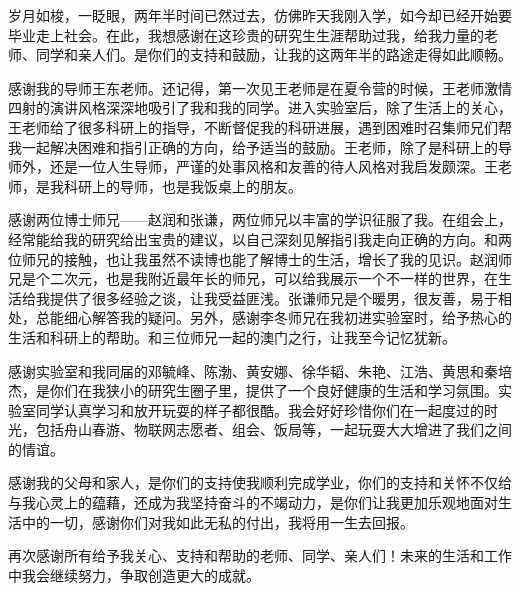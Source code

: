 \begin{thanks}
岁月如梭，一眨眼，两年半时间已然过去，仿佛昨天我刚入学，如今却已经开始要毕业走上社会。在此，我想感谢在这珍贵的研究生生涯帮助过我，给我力量的老师、同学和亲人们。是你们的支持和鼓励，让我的这两年半的路途走得如此顺畅。

感谢我的导师王东老师。还记得，第一次见王老师是在夏令营的时候，王老师激情四射的演讲风格深深地吸引了我和我的同学。进入实验室后，除了生活上的关心，王老师给了很多科研上的指导，不断督促我的科研进展，遇到困难时召集师兄们帮我一起解决困难和指引正确的方向，给予适当的鼓励。王老师，除了是科研上的导师外，还是一位人生导师，严谨的处事风格和友善的待人风格对我启发颇深。王老师，是我科研上的导师，也是我饭桌上的朋友。

感谢两位博士师兄——赵润和张谦，两位师兄以丰富的学识征服了我。在组会上，经常能给我的研究给出宝贵的建议，以自己深刻见解指引我走向正确的方向。和两位师兄的接触，也让我虽然不读博也能了解博士的生活，增长了我的见识。赵润师兄是个二次元，也是我附近最年长的师兄，可以给我展示一个不一样的世界，在生活给我提供了很多经验之谈，让我受益匪浅。张谦师兄是个暖男，很友善，易于相处，总能细心解答我的疑问。另外，感谢李冬师兄在我初进实验室时，给予热心的生活和科研上的帮助。和三位师兄一起的澳门之行，让我至今记忆犹新。

感谢实验室和我同届的邓毓峰、陈渤、黄安娜、徐华韬、朱艳、江浩、黄思和秦培杰，是你们在我狭小的研究生圈子里，提供了一个良好健康的生活和学习氛围。实验室同学认真学习和放开玩耍的样子都很酷。我会好好珍惜你们在一起度过的时光，包括舟山春游、物联网志愿者、组会、饭局等，一起玩耍大大增进了我们之间的情谊。

感谢我的父母和家人，是你们的支持使我顺利完成学业，你们的支持和关怀不仅给与我心灵上的蕴藉，还成为我坚持奋斗的不竭动力，是你们让我更加乐观地面对生活中的一切，感谢你们对我如此无私的付出，我将用一生去回报。

再次感谢所有给予我关心、支持和帮助的老师、同学、亲人们！未来的生活和工作中我会继续努力，争取创造更大的成就。

\end{thanks}
